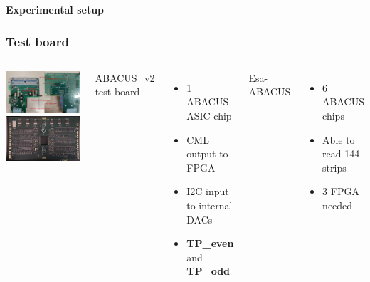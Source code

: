\documentclass[aspectratio=169]{beamer}
\begin{document}
\begin{frame}
\begin{center}
	{\Huge {}\selectfont \color{blue} \textbf{Experimental setup}}
\end{center}
\end{frame}



	\begin{frame}
	\frametitle{Test board}
		\begin{columns}
			\begin{center}
				\includegraphics[width=0.8 \textwidth]{IMG/TestBoard.pdf}
				\includegraphics[width=0.8 \textwidth]{IMG/EsaAbacus.png}
			\end{center}
			{\color{blue}ABACUS\_v2 test board}
			\begin{itemize}
				\item 1 ABACUS ASIC chip
				\item CML output to FPGA
				\item I2C input to internal DACs
				\item \textbf{TP\_even} and \textbf{TP\_odd}
			\end{itemize}
			{\color{blue}Esa-ABACUS}
			\begin{itemize}
				\item 6 ABACUS chips
				\item Able to read 144 strips
				\item 3 FPGA needed
			\end{itemize}
		\end{columns}	
	\end{frame}
\end{document}
